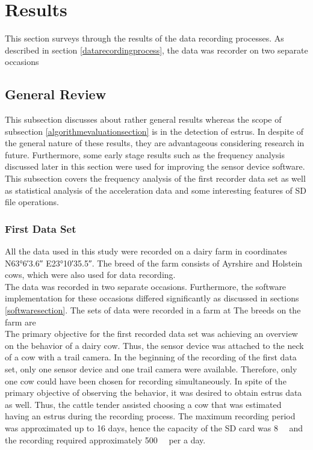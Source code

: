 \documentclass[english,12pt,a4paper,pdftex,elec,utf8]{aaltothesis}
\begin{document}
\clearpage

\section{Results} \label{resultssection}
 
This section surveys through the results of the data recording processes. As described in section \ref{datarecordingprocess}, the data was recorder on two separate occasions



\subsection{General Review} \label{generalreviewsection}

This subsection discusses about rather general results whereas the scope of subsection \ref{algorithmevaluationsection} is in the detection of estrus. In despite of the general nature of these results, they are advantageous considering research in future. Furthermore, some early stage results such as the frequency analysis discussed later in this section were used for improving the sensor device software. This subsection covers the frequency analysis of the first recorder data set as well as statistical analysis of the acceleration data and some interesting features of SD file operations. \\




\subsubsection{First Data Set} \label{firstdatasetsection}


All the data used in this study were recorded on a dairy farm in coordinates N\ang{63;6;3.6} E\ang{23;10;35.5}. The breed of the farm consists of Ayrshire and Holstein cows, which were also used for data recording. \\

The data was recorded in two separate occasions. Furthermore, the software implementation for these occasions differed significantly as discussed in sections \ref{softwaresection}. The sets of data were recorded in a farm at  The breeds on the farm are \\

The primary objective for the first recorded data set was achieving an overview on the behavior of a dairy cow. Thus, the sensor device was attached to the neck of a cow with a trail camera. In the beginning of the recording of the first data set, only one sensor device and one trail camera were available. Therefore, only one cow could have been chosen for recording simultaneously. In spite of the primary objective of observing the behavior, it was desired to obtain estrus data as well. Thus, the cattle tender assisted choosing a cow that was estimated having an estrus during the recording process. The maximum recording period was approximated up to 16 days, hence the capacity of the SD card was \SI{8}{\giga \byte} and the recording required approximately \SI{500}{\mega \byte} per a day. \\
\end{document}
